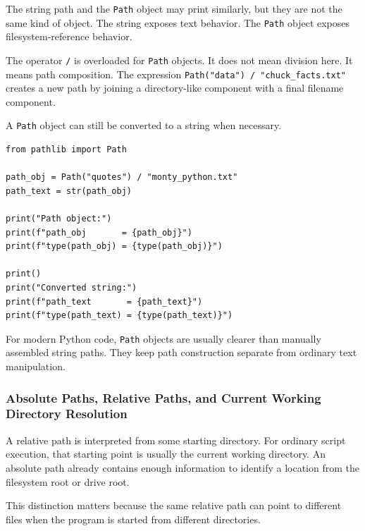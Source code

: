The string path and the \texttt{Path} object may print similarly, but they are not the same kind of object. The string exposes text behavior. The \texttt{Path} object exposes filesystem-reference behavior.

The operator \texttt{/} is overloaded for \texttt{Path} objects. It does not mean division here. It means path composition. The expression \texttt{Path("data") / "chuck\_facts.txt"} creates a new path by joining a directory-like component with a final filename component.

A \texttt{Path} object can still be converted to a string when necessary.

\begin{verbatim}
from pathlib import Path

path_obj = Path("quotes") / "monty_python.txt"
path_text = str(path_obj)

print("Path object:")
print(f"path_obj       = {path_obj}")
print(f"type(path_obj) = {type(path_obj)}")

print()
print("Converted string:")
print(f"path_text       = {path_text}")
print(f"type(path_text) = {type(path_text)}")
\end{verbatim}

For modern Python code, \texttt{Path} objects are usually clearer than manually assembled string paths. They keep path construction separate from ordinary text manipulation.

\subsubsection{Absolute Paths, Relative Paths, and Current Working Directory Resolution}

A relative path is interpreted from some starting directory. For ordinary script execution, that starting point is usually the current working directory. An absolute path already contains enough information to identify a location from the filesystem root or drive root.

This distinction matters because the same relative path can point to different files when the program is started from different directories.

